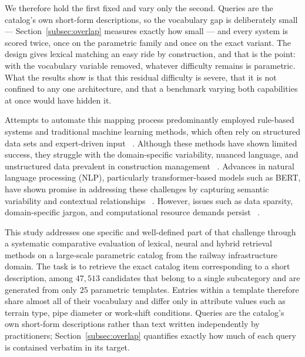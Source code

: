 \documentclass[preprint,12pt]{elsarticle}
\begin{document}
We therefore hold the first fixed and vary only the second. Queries are the catalog's own short-form descriptions, so the vocabulary gap is deliberately small --- Section~\ref{subsec:overlap} measures exactly how small --- and every system is scored twice, once on the parametric family and once on the exact variant. The design gives lexical matching an easy ride by construction, and that is the point: with the vocabulary variable removed, whatever difficulty remains is parametric. What the results show is that this residual difficulty is severe, that it is not confined to any one architecture, and that a benchmark varying both capabilities at once would have hidden it.

Attempts to automate this mapping process predominantly employed rule-based systems and traditional machine learning methods, which often rely on structured data sets and expert-driven input ~\cite{caldasAutomatingHierarchicalDocument2003, natural_wu_2022}. Although these methods have shown limited success, they struggle with the domain-specific variability, nuanced language, and unstructured data prevalent in construction management ~\cite{rampiniArtificialIntelligenceConstruction2022, baekCriticalReviewTextbased2021}. Advances in natural language processing (NLP), particularly transformer-based models such as BERT, have shown promise in addressing these challenges by capturing semantic variability and contextual relationships ~\cite{tangAutomatedConstructionQuantity2022, dezaMachineLearningApproach2022}. However, issues such as data sparsity, domain-specific jargon, and computational resource demands persist ~\cite{chungComparingNaturalLanguage2023, martinez-rojasUsingClassificationTechniques2018}.

This study addresses one specific and well-defined part of that challenge through a systematic comparative evaluation of lexical, neural and hybrid retrieval methods on a large-scale parametric catalog from the railway infrastructure domain. The task is to retrieve the exact catalog item corresponding to a short description, among $47{,}513$ candidates that belong to a single subcategory and are generated from only $25$ parametric templates. Entries within a template therefore share almost all of their vocabulary and differ only in attribute values such as terrain type, pipe diameter or work-shift conditions. Queries are the catalog's own short-form descriptions rather than text written independently by practitioners; Section~\ref{subsec:overlap} quantifies exactly how much of each query is contained verbatim in its target.
\end{document}
